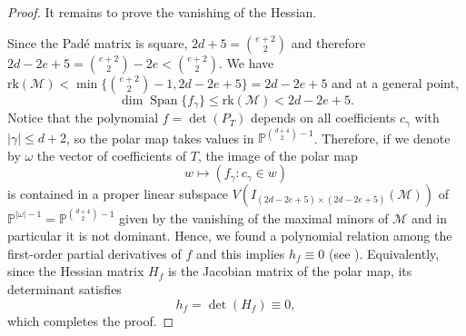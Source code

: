 \documentclass[letterpaper,11pt]{amsart}
\theoremstyle{plain}
\theoremstyle{definition}
\newcommand{\enm}[1]{\ensuremath{#1}}          %
\newcommand{\PP}{\enm{\mathbb{P}}}
\begin{document}
\begin{proof}
It remains to prove the vanishing of the Hessian. 

 Since the Pad\'e matrix is square, $2d+5={e+2 \choose 2}$ and therefore $2d-2e+5={e+2 \choose 2}-2e<{e+2 \choose 2}$. We have $\mathrm{rk}(\mathcal M)<\min\{\binom{e+2}{2}-1,2d-2e+5\} =2d-2e+5$ %
and at a general point,
\[
\dim \operatorname{Span}\{f_\gamma\} \leq\mathrm{rk}(\mathcal M) < 2d-2e+5.
\]
Notice that the polynomial $f = \det(P_T)$ depends on all 
coefficients $c_\gamma$ with $|\gamma| \leq d+2$, 
so the polar map takes values in 
$\mathbb{P}^{\binom{d+4}{2}-1}$. Therefore, if we denote by $\omega$ the vector of coefficients of $T$, the image of the polar map
$$
w \longmapsto (f_\gamma : c_\gamma \in w) 
$$
is contained in a proper
linear subspace $V(I_{(2d-2e+5)\times(2d-2e+5)}(\mathcal M))$ of $\PP^{|\omega| -1}=\mathbb{P}^{\binom{d+4}{2}-1}$ given by the vanishing of the maximal minors of $\mathcal M$ and in particular it is not dominant. Hence, we found a polynomial relation among the first-order partial derivatives of $f$ and this implies $ h_f\equiv 0$ (see \cite[\S 7.2.1]{R16}).
Equivalently, since the Hessian matrix $H_f$ is the Jacobian matrix 
of the polar map, its determinant satisfies
$$
h_f = \det(H_f) \equiv 0,
$$
which completes the proof.
\end{proof}
\end{document}

